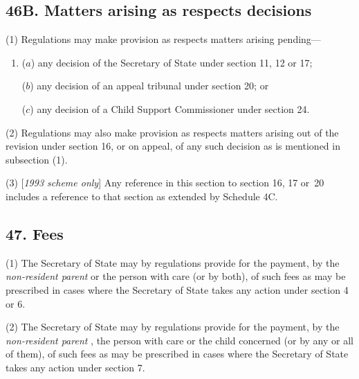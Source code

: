 \documentclass[12pt,a4paper]{article}
\begin{document}
\subsection{46B. Matters arising as respects decisions}

(1) Regulations may make provision as respects matters arising pending—
\begin{enumerate}\item[]
($a$) any decision of the Secretary of State under section 11, 12 or 17;

($b$) any decision of an appeal tribunal under section 20; or

($c$) any decision of a Child Support Commissioner under section 24.
\end{enumerate}

(2) Regulations may also make provision as respects matters arising out of the revision under section 16, or on appeal, of any such decision as is mentioned in subsection (1).

(3) [\emph{1993 scheme only}] Any reference in this section to section 16, 17 or~20 includes a reference to that section as extended by Schedule 4C.


\subsection{47. Fees}

(1) The Secretary of State may by regulations provide for the payment, by the 
\emph{non-resident parent}  %
or the person with care (or by both), of such fees as may be prescribed in cases where the Secretary of State takes any action under section 4 or 6.

(2) The Secretary of State may by regulations provide for the payment, by the 
\emph{non-resident parent}%
, the person with care or the child concerned (or by any or all of them), of such fees as may be prescribed in cases where the Secretary of State takes any action under section 7.
\end{document}
